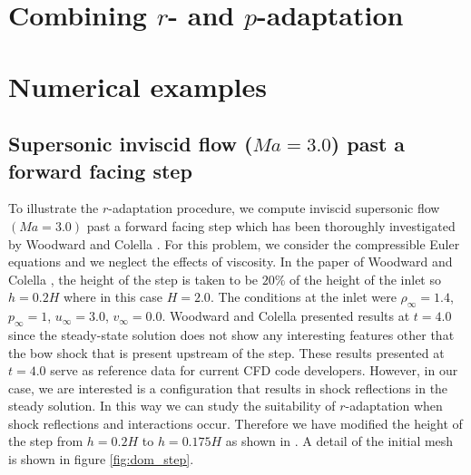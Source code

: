\documentclass[review]{elsarticle}
\begin{document}
\section{Combining $r$- and $p$-adaptation}

\section{Numerical examples}

\subsection{Supersonic inviscid flow ($Ma=3.0$) past a forward facing step}
To illustrate the $r$-adaptation procedure, we compute inviscid supersonic flow $({Ma=3.0})$ 
past a forward facing step which has been thoroughly investigated by Woodward and Colella \cite{Woodward1984}. 
For this problem, we consider the compressible Euler equations and we neglect the effects of viscosity.
In the paper of Woodward and Colella \cite{Woodward1984}, the height of the step is taken to be $20\%$ of the height of the inlet so $h = 0.2H$ where in this case $H=2.0$. 
The conditions at the inlet were $\rho_\infty = 1.4$, $p_\infty=1$, $u_\infty=3.0$, $v_\infty = 0.0$. 
Woodward and Colella \cite{Woodward1984} presented results at $t=4.0$ since the steady-state solution does not show any interesting features other that the bow shock that is present upstream of the step.
These results presented at $t=4.0$ serve as reference data for current CFD code developers. However, in our case, we are interested is a configuration that results in shock reflections in the steady solution.
In this way we can study the suitability of $r$-adaptation when shock reflections and interactions occur. 
Therefore we have modified the height of the step from $h=0.2H$ to $h=0.175H$ as shown in \cite{Moura2016}. A detail of the initial mesh is shown in figure \ref{fig:dom_step}.
\end{document}
